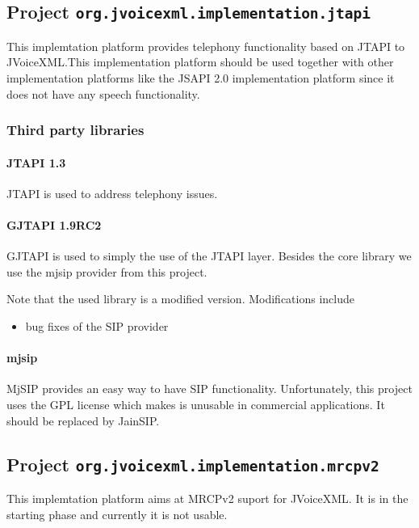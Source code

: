 \documentclass[11pt,a4paper]{article}
\begin{document}
\subsection{Project \lstinline{org.jvoicexml.implementation.jtapi}}

This implemtation platform provides telephony functionality based on JTAPI to
JVoiceXML.This implementation platform should be used together with other
implementation platforms like the JSAPI 2.0 implementation platform since it
does not have any speech functionality.


\subsubsection{Third party libraries}
\label{sec:jtapi-third-party-libr}

\paragraph{JTAPI 1.3}

JTAPI is used to address telephony issues.

\paragraph{GJTAPI 1.9RC2}

GJTAPI is used to simply the use of the JTAPI layer. Besides the core library
we use the mjsip provider from this project.

Note that the used library is a modified version. Modifications include
\begin{itemize}
\item bug fixes of the SIP provider
\end{itemize}

\paragraph{mjsip}

MjSIP provides an easy way to have SIP functionality. Unfortunately, this
project uses the GPL license which makes is unusable in commercial
applications. It should be replaced by JainSIP.

\subsection{Project \lstinline{org.jvoicexml.implementation.mrcpv2}}

This implemtation platform aims at MRCPv2 suport for JVoiceXML. It is in the
starting phase and currently it is not usable.
\end{document}
